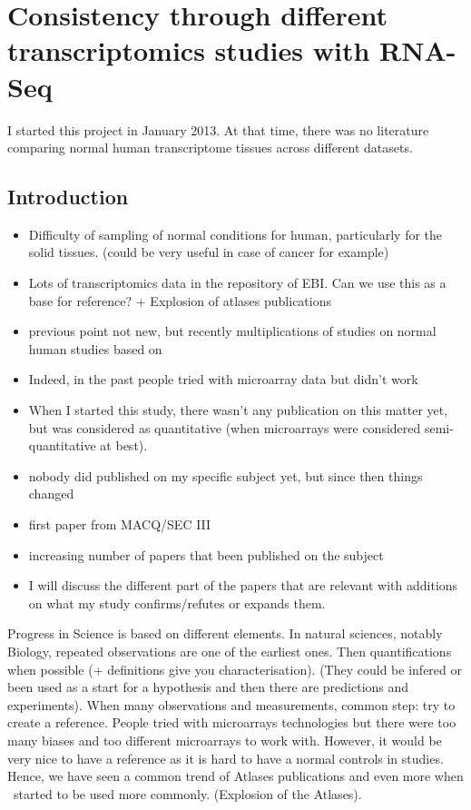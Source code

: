 \chapter{Consistency through different transcriptomics studies with RNA-Seq}
\label{ch:Transcriptomics}

I started this project in January 2013. At that time, there was no
literature comparing normal human transcriptome tissues across different datasets.

\section{Introduction}

\begin{itemize}
    \item Difficulty of sampling of normal conditions for human, particularly
        for the solid tissues. (could be very useful in case of cancer for
        example)
    \item Lots of transcriptomics data in the repository of EBI. Can we use
        this as a base for reference? + Explosion of atlases publications
    \item previous point not new, but recently multiplications of studies on
        normal human studies based on \Rnaseq
    \item Indeed, in the past people tried with microarray data but didn't work
    \item When I started this study, there wasn't any publication on this matter
        yet, but \Rnaseq was considered as quantitative (when microarrays were
        considered semi-quantitative at best).
    \item nobody did published on my specific subject yet, but since then things changed
    \item first paper from MACQ/SEC III
    \item increasing number of papers that been published on the subject
    \item I will discuss the different part of the papers that are relevant
        with additions on what my study confirms/refutes or expands them.
\end{itemize}

Progress in Science is based on different elements. In natural sciences, notably
Biology, repeated observations are one of the earliest ones. Then quantifications
when possible (+ definitions give you characterisation). (They could be infered or
been used as a start for a hypothesis and then there are predictions and
experiments). When many observations and measurements, common step: try to create
a reference. People tried with microarrays technologies but there were too many
biases and too different microarrays to work with. However, it would be very nice
to have a reference as it is hard to have a normal controls in studies. Hence, we
have seen a common trend of Atlases publications and even more when \Rnaseq\ started
to be used more commonly. (Explosion of the Atlases).

